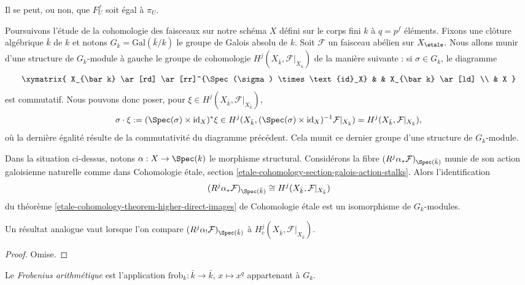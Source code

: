 \begin{remark}
\label{remark-may-be-confusing}
Il se peut, ou non, que $F^f_U$ soit égal à $\pi_U$.
\end{remark}

\noindent
Poursuivons l'étude de la cohomologie des faisceaux sur notre schéma $X$ défini
sur le corps fini $k$ à $q = p^f$ éléments.
Fixons une clôture algébrique $\bar k$ de $k$ et notons $G_k =
\text{Gal}(\bar k/k)$ le groupe de Galois absolu de $k$.
Soit $\mathcal{F}$ un faisceau abélien sur $X_\etale$.
Nous allons munir d'une structure de $G_k$-module à gauche le
groupe de cohomologie $H^j (X_{\bar k}, \mathcal{F}|_{X_{\bar k}})$
de la manière suivante : si $\sigma \in G_k$, le diagramme
$$
\xymatrix{
X_{\bar k} \ar[rd] \ar[rr]^{\Spec(\sigma) \times \text{id}_X} & &
X_{\bar k} \ar[ld] \\
& X
}
$$
est commutatif. Nous pouvons donc poser, pour $\xi \in H^j (X_{\bar k},
\mathcal{F}|_{X_{\bar k}})$,
$$
\sigma \cdot \xi := (\Spec(\sigma) \times \text{id}_X)^*\xi \in
H^j(X_{\bar k}, (\Spec(\sigma) \times \text{id}_X)^{-1}
\mathcal{F}|_{X_{\bar k}})
= H^j (X_{\bar k}, \mathcal{F}|_{X_{\bar k}}),
$$
où la dernière égalité résulte de la commutativité du diagramme précédent.
Cela munit ce dernier groupe d'une structure de $G_k$-module.

\begin{lemma}
\label{lemma-two-actions-agree}
Dans la situation ci-dessus, notons $\alpha : X \to \Spec(k)$ le morphisme
structural. Considérons la fibre $(R^j\alpha_*\mathcal{F})_{\Spec(\bar k)}$
munie de son action galoisienne naturelle comme dans
Cohomologie étale, section \ref{etale-cohomology-section-galois-action-stalks}.
Alors l'identification
$$
(R^j\alpha_*\mathcal{F})_{\Spec(\bar k)} \cong H^j (X_{\bar k},
\mathcal{F}|_{X_{\bar k}})
$$
du
théorème \ref{etale-cohomology-theorem-higher-direct-images} de Cohomologie étale
est un isomorphisme de $G_k$-modules.
\end{lemma}

\noindent
Un résultat analogue vaut lorsque l'on compare
$(R^j\alpha_!\mathcal{F})_{\Spec(\bar k)}$ à
$H^j_c (X_{\bar k}, \mathcal{F}|_{X_{\bar k}})$.

\begin{proof}
Omise.
\end{proof}

\begin{definition}
\label{definition-arithmetic-frobenius}
Le {\it Frobenius arithmétique} est l'application
$\text{frob}_k : \bar k \to \bar k$, $x \mapsto x^q$ appartenant à $G_k$.
\end{definition}

